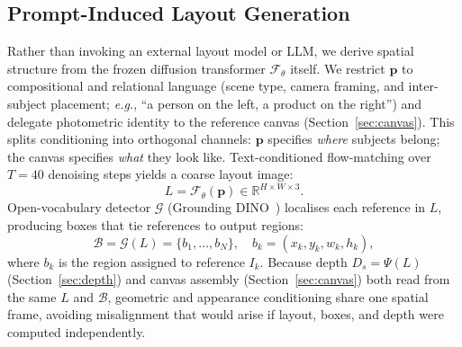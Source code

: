 \documentclass[runningheads]{llncs}
\begin{document}
\subsection{Prompt-Induced Layout Generation}
\label{sec:layout}
Rather than invoking an external layout model or LLM, we derive spatial structure from the frozen diffusion transformer $\mathcal{F}_\theta$ itself.
We restrict $\mathbf{p}$ to compositional and relational language (scene type, camera framing, and inter-subject placement; \emph{e.g.}, ``a person on the left, a product on the right'') and delegate photometric identity to the reference canvas (Section~\ref{sec:canvas}).
This splits conditioning into orthogonal channels: $\mathbf{p}$ specifies \emph{where} subjects belong; the canvas specifies \emph{what} they look like.
Text-conditioned flow-matching over $T{=}40$ denoising steps yields a coarse layout image:
\begin{equation}
  L = \mathcal{F}_\theta(\mathbf{p}) \in \mathbb{R}^{H \times W \times 3}.
\end{equation}
Open-vocabulary detector $\mathcal{G}$ (Grounding DINO~\cite{liu2023grounding}) localises each reference in $L$, producing boxes that tie references to output regions:
\begin{equation}
  \mathcal{B} = \mathcal{G}(L) = \{b_1, \ldots, b_N\}, \quad b_k = (x_k, y_k, w_k, h_k),
\end{equation}
where $b_k$ is the region assigned to reference $I_k$.
Because depth $D_s=\Psi(L)$ (Section~\ref{sec:depth}) and canvas assembly (Section~\ref{sec:canvas}) both read from the same $L$ and $\mathcal{B}$, geometric and appearance conditioning share one spatial frame, avoiding misalignment that would arise if layout, boxes, and depth were computed independently.

\end{document}
